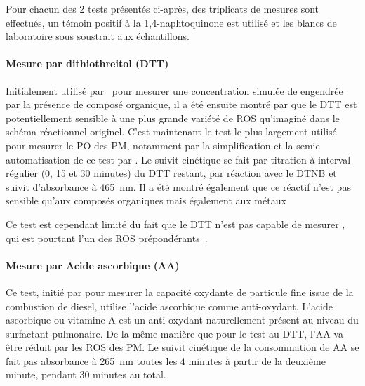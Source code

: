 Pour chacun des 2 tests présentés ci-après, des triplicats de mesures sont effectués, un
témoin positif à la 1,4-naphtoquinone est utilisé et les blancs de laboratoire sous
soustrait aux échantillons.

\paragraph{Mesure par dithiothreitol (DTT)}%
\label{ssub:mesure_par_dithiothreitol}

Initialement utilisé par~\textcite{choRedox2005} pour mesurer une concentration simulée de
 engendrée par la présence de composé organique, il a été ensuite montré par
\textcite{beiReaction2014} que le DTT est potentiellement sensible à une plus grande
variété de ROS qu'imaginé dans le schéma réactionnel originel. C'est maintenant le test le
plus largement utilisé pour mesurer le PO des PM, notamment par la simplification et
la semie automatisation de ce test par \textcite{fangSemiautomated2015}.
Le suivit cinétique se fait par titration à interval régulier (0, 15 et 30 minutes) du DTT
restant, par réaction avec le DTNB et suivit d'absorbance à \SI{465}{nm}.
Il a été montré également que ce réactif n'est pas sensible qu'aux composés organiques
mais également aux métaux~\autocite{charrierDithiothreitol2012,linGeneration2011}

Ce test est cependant limité du fait que le DTT n'est pas capable de mesurer
, qui est pourtant l'un des ROS prépondérants~\autocite{xiongRethinking2017}.

\paragraph{Mesure par Acide ascorbique (AA)}%
\label{ssub:mesure_par_acide_ascorbique}

Ce test, initié par \textcite{zielinskiModeling1999} pour mesurer la capacité oxydante de
particule fine issue de la combustion de diesel, utilise l'acide ascorbique comme
anti-oxydant.
L'acide ascorbique ou vitamine-A est un anti-oxydant naturellement présent au niveau du
surfactant pulmonaire. De la même manière que pour le test au DTT, l'AA va être réduit par
les ROS des PM.
Le suivit cinétique de la consommation de AA se fait pas absorbance à \SI{265}{\nano\m}
toutes les 4 minutes à partir de la deuxième minute, pendant 30 minutes au total.


